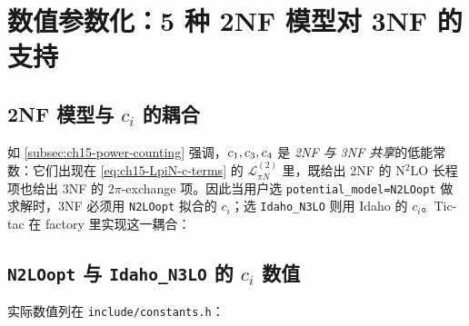 \section{数值参数化：5 种 2NF 模型对 3NF 的支持}
\label{sec:ch15-parametrization}

\subsection{2NF 模型与 \(c_i\) 的耦合}
\label{subsec:ch15-2nf-coupling}

如 \cref{subsec:ch15-power-counting} 强调，\(c_1, c_3, c_4\) 是
\emph{2NF 与 3NF 共享}的低能常数：它们出现在 \cref{eq:ch15-LpiN-c-terms}
的 \(\mathcal{L}^{(2)}_{\pi N}\) 里，既给出 2NF 的 N\(^2\)LO 长程项也给出
3NF 的 2\(\pi\)-exchange 项。因此当用户选 \texttt{potential\_model=N2LOopt}
做求解时，3NF 必须用 \texttt{N2LOopt} 拟合的 \(c_i\)；选 \texttt{Idaho\_N3LO}
则用 Idaho 的 \(c_i\)。Tic-tac 在 factory 里实现这一耦合：



\subsection{\texttt{N2LOopt} 与 \texttt{Idaho\_N3LO} 的 \(c_i\) 数值}
\label{subsec:ch15-ci-numerics}

实际数值列在 \texttt{include/constants.h}：





